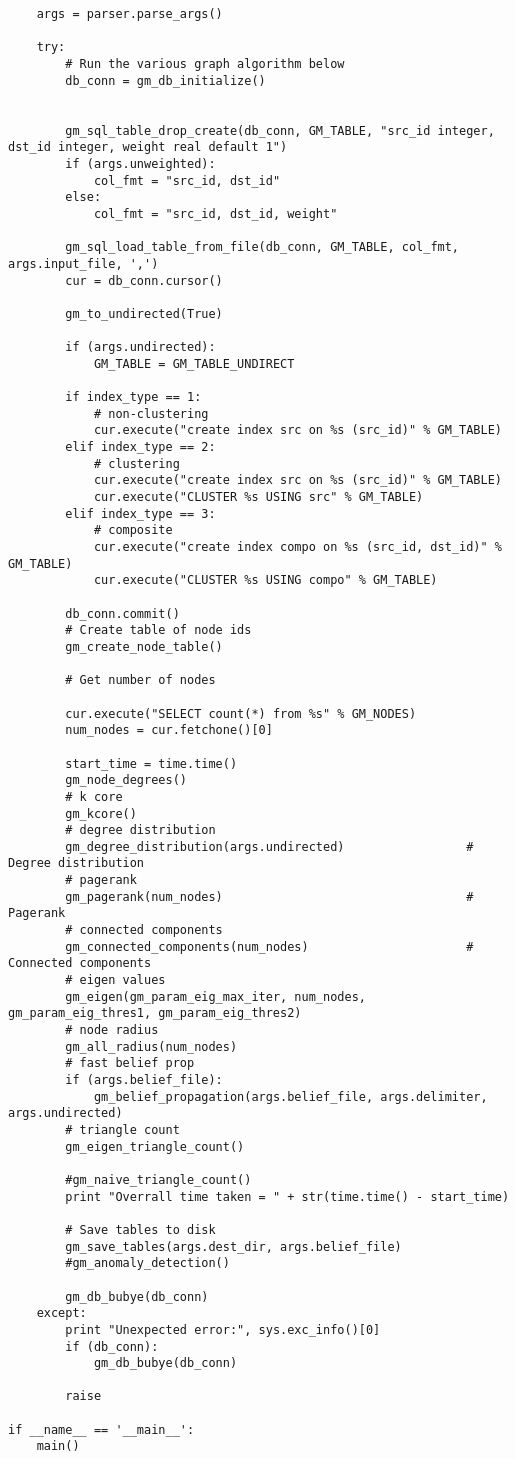 \documentclass[11pt]{article}
\begin{document}
\begin{lstlisting}
    args = parser.parse_args()
    
    try:
        # Run the various graph algorithm below
        db_conn = gm_db_initialize()
        
        
        gm_sql_table_drop_create(db_conn, GM_TABLE, "src_id integer, dst_id integer, weight real default 1")
        if (args.unweighted):
            col_fmt = "src_id, dst_id"
        else:
            col_fmt = "src_id, dst_id, weight"
            
        gm_sql_load_table_from_file(db_conn, GM_TABLE, col_fmt, args.input_file, ',')
        cur = db_conn.cursor()
        
        gm_to_undirected(True)
        
        if (args.undirected):
            GM_TABLE = GM_TABLE_UNDIRECT
        
        if index_type == 1:
            # non-clustering           
            cur.execute("create index src on %s (src_id)" % GM_TABLE)
        elif index_type == 2:
            # clustering
            cur.execute("create index src on %s (src_id)" % GM_TABLE)
            cur.execute("CLUSTER %s USING src" % GM_TABLE)
        elif index_type == 3:
            # composite
            cur.execute("create index compo on %s (src_id, dst_id)" % GM_TABLE)
            cur.execute("CLUSTER %s USING compo" % GM_TABLE)

        db_conn.commit()
        # Create table of node ids
        gm_create_node_table()

        # Get number of nodes
        
        cur.execute("SELECT count(*) from %s" % GM_NODES)
        num_nodes = cur.fetchone()[0]  

        start_time = time.time()
        gm_node_degrees()
        # k core
        gm_kcore()
        # degree distribution
        gm_degree_distribution(args.undirected)                 # Degree distribution
        # pagerank
        gm_pagerank(num_nodes)                                  # Pagerank
        # connected components
        gm_connected_components(num_nodes)                      # Connected components
        # eigen values
        gm_eigen(gm_param_eig_max_iter, num_nodes, gm_param_eig_thres1, gm_param_eig_thres2)    
        # node radius
        gm_all_radius(num_nodes)
        # fast belief prop
        if (args.belief_file):
            gm_belief_propagation(args.belief_file, args.delimiter, args.undirected)
        # triangle count
        gm_eigen_triangle_count()

        #gm_naive_triangle_count()
        print "Overrall time taken = " + str(time.time() - start_time)

        # Save tables to disk
        gm_save_tables(args.dest_dir, args.belief_file)
        #gm_anomaly_detection()
                     
        gm_db_bubye(db_conn)
    except:
        print "Unexpected error:", sys.exc_info()[0]    
        if (db_conn):
            gm_db_bubye(db_conn)
            
        raise                    

if __name__ == '__main__':
    main()
\end{lstlisting}
\end{document}
